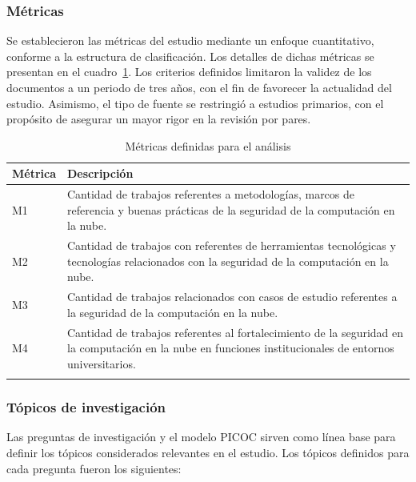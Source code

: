 \subsubsection{Métricas}

Se establecieron las métricas del estudio mediante un enfoque cuantitativo, conforme a la estructura de clasificación. Los detalles de 
dichas métricas se presentan en el cuadro~\ref{tab:metricas}. Los criterios definidos limitaron la validez de los documentos a un periodo 
de tres años, con el fin de favorecer la actualidad del estudio. Asimismo, el tipo de fuente se restringió a estudios primarios, con el 
propósito de asegurar un mayor rigor en la revisión por pares.

\begin{table}[htbp]
    \centering
    \renewcommand{\arraystretch}{1.3}
    \begin{tabularx}{\columnwidth}{>{\centering\arraybackslash}m{} >{\raggedright\arraybackslash}X}
    \toprule
    \textbf{Métrica} & \textbf{Descripción} \\
    \midrule
    M1 & Cantidad de trabajos referentes a  metodologías, marcos de referencia y buenas prácticas  de la seguridad de la computación en la nube. \\
    M2 & Cantidad de trabajos con referentes de herramientas tecnológicas y tecnologías relacionados con la seguridad de la computación en la nube. \\
    M3 & Cantidad de trabajos relacionados con casos de estudio referentes a la seguridad de la computación en la nube. \\
    M4 & Cantidad de trabajos referentes al fortalecimiento de la seguridad en la computación en la nube en funciones institucionales de entornos universitarios. \\
    \bottomrule
    \vspace{1pt}
    \end{tabularx}
    \caption{Métricas definidas para el análisis}\label{tab:metricas}
\end{table}

\subsubsection{Tópicos de investigación}

Las preguntas de investigación y el modelo PICOC sirven como línea base para definir los tópicos considerados relevantes en el estudio.
Los tópicos definidos para cada pregunta fueron los siguientes:

